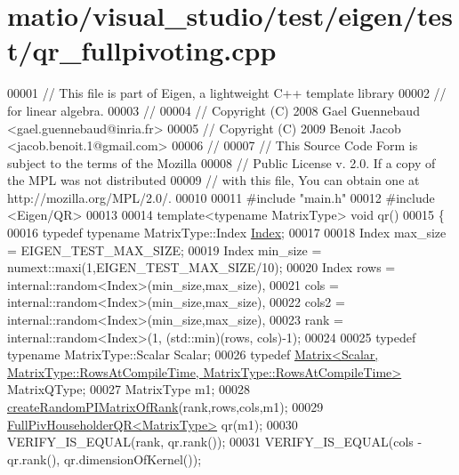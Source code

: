 \hypertarget{matio_2visual__studio_2test_2eigen_2test_2qr__fullpivoting_8cpp_source}{}\section{matio/visual\+\_\+studio/test/eigen/test/qr\+\_\+fullpivoting.cpp}
\label{matio_2visual__studio_2test_2eigen_2test_2qr__fullpivoting_8cpp_source}

\begin{DoxyCode}
00001 \textcolor{comment}{// This file is part of Eigen, a lightweight C++ template library}
00002 \textcolor{comment}{// for linear algebra.}
00003 \textcolor{comment}{//}
00004 \textcolor{comment}{// Copyright (C) 2008 Gael Guennebaud <gael.guennebaud@inria.fr>}
00005 \textcolor{comment}{// Copyright (C) 2009 Benoit Jacob <jacob.benoit.1@gmail.com>}
00006 \textcolor{comment}{//}
00007 \textcolor{comment}{// This Source Code Form is subject to the terms of the Mozilla}
00008 \textcolor{comment}{// Public License v. 2.0. If a copy of the MPL was not distributed}
00009 \textcolor{comment}{// with this file, You can obtain one at http://mozilla.org/MPL/2.0/.}
00010 
00011 \textcolor{preprocessor}{#include "main.h"}
00012 \textcolor{preprocessor}{#include <Eigen/QR>}
00013 
00014 \textcolor{keyword}{template}<\textcolor{keyword}{typename} MatrixType> \textcolor{keywordtype}{void} qr()
00015 \{
00016   \textcolor{keyword}{typedef} \textcolor{keyword}{typename} MatrixType::Index \hyperlink{namespace_eigen_a62e77e0933482dafde8fe197d9a2cfde}{Index};
00017 
00018   Index max\_size = EIGEN\_TEST\_MAX\_SIZE;
00019   Index min\_size = numext::maxi(1,EIGEN\_TEST\_MAX\_SIZE/10);
00020   Index rows  = internal::random<Index>(min\_size,max\_size),
00021         cols  = internal::random<Index>(min\_size,max\_size),
00022         cols2 = internal::random<Index>(min\_size,max\_size),
00023         rank  = internal::random<Index>(1, (std::min)(rows, cols)-1);
00024 
00025   \textcolor{keyword}{typedef} \textcolor{keyword}{typename} MatrixType::Scalar Scalar;
00026   \textcolor{keyword}{typedef} 
      \hyperlink{group___core___module_class_eigen_1_1_matrix}{Matrix<Scalar, MatrixType::RowsAtCompileTime, MatrixType::RowsAtCompileTime>}
       MatrixQType;
00027   MatrixType m1;
00028   \hyperlink{namespace_eigen_a0d9a7ddcee5c7c8defaba3628455efb2}{createRandomPIMatrixOfRank}(rank,rows,cols,m1);
00029   \hyperlink{group___q_r___module}{FullPivHouseholderQR<MatrixType>} qr(m1);
00030   VERIFY\_IS\_EQUAL(rank, qr.rank());
00031   VERIFY\_IS\_EQUAL(cols - qr.rank(), qr.dimensionOfKernel());

\end{DoxyCode}
